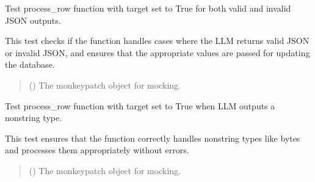 \documentclass[letterpaper,10pt,english]{sphinxmanual}
\begin{document}

\begin{fulllineitems}
\label{\detokenize{test.data_storage:test.data_storage.test_llm_analyse.test_process_row_target_json_and_nonjson}}
\pysigstartsignatures
\pysiglinewithargsret
{}
{}
{}
\pysigstopsignatures
\sphinxAtStartPar
Test process\_row function with target set to True for both valid and invalid JSON outputs.

\sphinxAtStartPar
This test checks if the function handles cases where the LLM returns valid JSON
or invalid JSON, and ensures that the appropriate values are passed for updating
the database.
\begin{quote}\begin{description}
\sphinxAtStartPar
{} () \textendash{} The monkeypatch object for mocking.

\end{description}\end{quote}

\end{fulllineitems}


\begin{fulllineitems}
\label{\detokenize{test.data_storage:test.data_storage.test_llm_analyse.test_process_row_target_non_str_output}}
\pysigstartsignatures
\pysiglinewithargsret
{}
{}
{}
\pysigstopsignatures
\sphinxAtStartPar
Test process\_row function with target set to True when LLM outputs a non\sphinxhyphen{}string type.

\sphinxAtStartPar
This test ensures that the function correctly handles non\sphinxhyphen{}string types like bytes
and processes them appropriately without errors.
\begin{quote}\begin{description}
\sphinxAtStartPar
{} () \textendash{} The monkeypatch object for mocking.

\end{description}\end{quote}

\end{fulllineitems}
\end{document}
